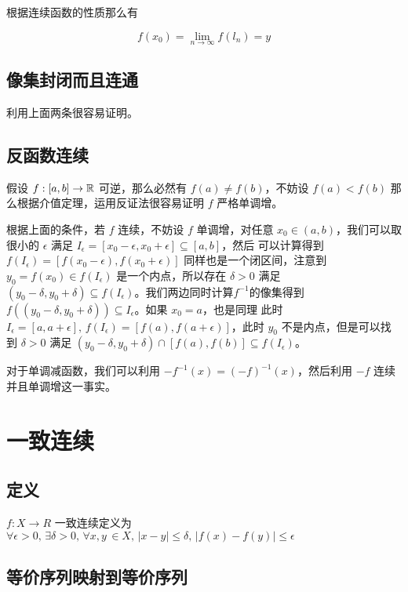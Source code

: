 根据连续函数的性质那么有

\[
f(x_0) = \lim_{n \to \infty}f(l_n) = y
\]

\subsection{像集封闭而且连通}

利用上面两条很容易证明。


\subsection{反函数连续}

假设 $f: [a,b] \to \mathbb{R}$ 可逆，那么必然有 $f(a) \ne f(b)$，不妨设 $f(a) < f(b)$ 那么根据介值定理，运用反证法很容易证明 $f$ 严格单调增。

根据上面的条件，若 $f$ 连续，不妨设 $f$ 单调增，对任意 $x_0 \in (a,b)$，我们可以取很小的 $\epsilon$ 满足 $I_{\epsilon}  = [x_0 - \epsilon, x_0 + \epsilon] \subseteq [a,b]$，然后
可以计算得到 $f(I_{\epsilon}) = [f(x_0 - \epsilon), f(x_0 + \epsilon)]$ 同样也是一个闭区间，注意到 $y_0 = f(x_0) \in f(I_{\epsilon})$ 是一个内点，所以存在 $\delta > 0$ 满足
$(y_0 - \delta, y_0 + \delta) \subseteq f(I_{\epsilon})$。我们两边同时计算$f^{-1}$的像集得到 $f((y_0 - \delta, y_0 + \delta)) \subseteq I_{\epsilon}$。如果 $x_0 = a$，也是同理
此时 $I_{\epsilon} = [a, a + \epsilon],\, f(I_{\epsilon}) = [f(a), f(a+\epsilon)]$，此时 $y_0$ 不是内点，但是可以找到 $\delta > 0$ 满足 $(y_0 - \delta, y_0 + \delta) \cap [f(a), f(b)] \subseteq f(I_{\epsilon})$。

对于单调减函数，我们可以利用 $-f^{-1}(x)= (-f)^{-1}(x)$，然后利用 $-f$ 连续并且单调增这一事实。


\section{一致连续}

\subsection{定义}
$f: X \to R$ 一致连续定义为 $\forall \epsilon > 0,\, \exists \delta >0,\, \forall x,y\, \in X,\, \lvert x - y \rvert \le \delta,\, \lvert f(x) -f(y) \rvert \le \epsilon$

\subsection{等价序列映射到等价序列}

